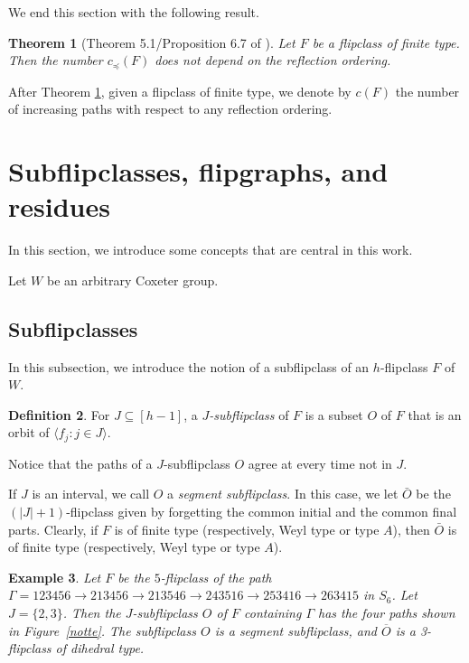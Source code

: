 \documentclass[12pt,reqno]{amsart}
\theoremstyle{plain}
\newtheorem{thm}{Theorem}[section]
\newtheorem{exa}[thm]{Example}
\theoremstyle{definition}
\newtheorem{defn}[thm]{Definition}
\theoremstyle{remark}
\begin{document}
We end this section with the following result. 
\begin{thm}[Theorem 5.1/Proposition 6.7 of \cite{EMS}]
\label{nondipende}
Let $F$ be a  flipclass of finite type. Then the  number $c_{\preceq}(F)$ does not depend on the reflection ordering.
\end{thm}
After Theorem \ref{nondipende}, given a flipclass of finite type,  we denote by $c(F)$ the number of increasing paths with respect to any reflection ordering. 


\section{Subflipclasses, flipgraphs, and residues}
In this section, we introduce some concepts that are central in this work.

Let $W$ be an arbitrary Coxeter group.
\subsection{Subflipclasses}
In this subsection, we introduce the notion of a subflipclass of an $h$-flipclass $F$ of $W$.
\begin{defn}
For $J \subseteq [h-1]$, a \emph{$J$-subflipclass} of $F$ is  a subset $O$ of $F$ that is an orbit of
$\langle f_j : j \in J\rangle$.
\end{defn} 
Notice that the paths of a $J$-subflipclass $O$ agree at every time not in $J$.  

If $J$ is an interval, we call $O$ a \emph{segment subflipclass}. In this case, we let $\bar{O}$ be the $(|J|+1)$-flipclass given by forgetting the common initial and the common final parts. Clearly, if $F$ is of finite type (respectively, Weyl type or type $A$), then $\bar{O}$ is of finite type (respectively, Weyl type or type $A$).

\begin{exa}
Let $F$ be the $5$-flipclass of the path $\Gamma = 123456 \longrightarrow 213456 \longrightarrow 213546 \longrightarrow 243516 \longrightarrow 253416 \longrightarrow 263415$ in $S_6$. Let $J = \{2,3\}$. Then the $J$-subflipclass $O$ of $F$ containing $\Gamma$ has the four paths shown in Figure~\ref{notte}. The subflipclass $O$ is a segment subflipclass, and $\overline{O}$ is a 3-flipclass of dihedral type.
\end{exa}
\end{document}
